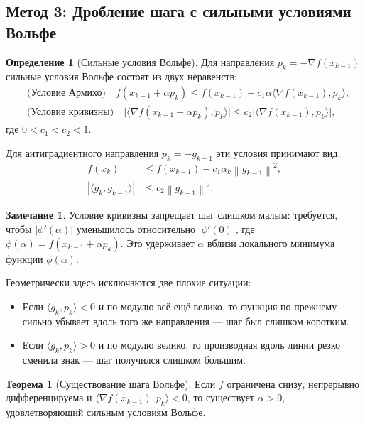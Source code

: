 \documentclass[a4paper,12pt]{article}
\newcommand{\norm}[1]{\left\|#1\right\|}
\newcommand{\grad}{\nabla}
\theoremstyle{definition}
\newtheorem{definition}{Определение}[section]
\newtheorem{theorem}{Теорема}[section]
\newtheorem{remark}{Замечание}[section]
\begin{document}
\subsection{Метод 3: Дробление шага с сильными условиями Вольфе}

\begin{definition}[Сильные условия Вольфе]
    Для направления $p_k = -\grad f(x_{k-1})$ сильные условия Вольфе состоят из двух неравенств:
    \begin{align}
        &\text{(Условие Армихо)} \quad
        f(x_{k-1} + \alpha p_k) \leq f(x_{k-1}) + c_1 \alpha \langle \grad f(x_{k-1}), p_k \rangle, \\
        &\text{(Условие кривизны)} \quad
        \bigl| \langle \grad f(x_{k-1} + \alpha p_k), p_k \rangle \bigr| \leq c_2 \bigl| \langle \grad f(x_{k-1}), p_k \rangle \bigr|,
    \end{align}
    где $0 < c_1 < c_2 < 1$.
\end{definition}

Для антиградиентного направления $p_k = -g_{k-1}$ эти условия принимают вид:
\begin{align}
    f(x_k) &\leq f(x_{k-1}) - c_1 \alpha_k \norm{g_{k-1}}^2, \\
    |\langle g_k, g_{k-1} \rangle| &\leq c_2 \norm{g_{k-1}}^2.
\end{align}

\begin{remark}
    Условие кривизны запрещает шаг слишком малым: требуется, чтобы $|\phi'(\alpha)|$ уменьшилось 
    относительно $|\phi'(0)|$, где $\phi(\alpha) = f(x_{k-1} + \alpha p_k)$. 
    Это удерживает $\alpha$ вблизи локального минимума функции $\phi(\alpha)$.
    
    Геометрически здесь исключаются две плохие ситуации:
    \begin{itemize}
        \item Если $\langle g_k, p_k \rangle < 0$ и по модулю всё ещё велико, то функция по-прежнему 
              сильно убывает вдоль того же направления — шаг был слишком коротким.
        \item Если $\langle g_k, p_k \rangle > 0$ и по модулю велико, то производная вдоль линии 
              резко сменила знак — шаг получился слишком большим.
    \end{itemize}
\end{remark}

\begin{theorem}[Существование шага Вольфе]
    Если $f$ ограничена снизу, непрерывно дифференцируема и $\langle \grad f(x_{k-1}), p_k \rangle < 0$,
    то существует $\alpha > 0$, удовлетворяющий сильным условиям Вольфе.
\end{theorem}
\end{document}
